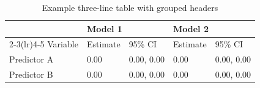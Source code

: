 \begin{table}[htbp]
\raggedright
\caption{Example three-line table with grouped headers}
\label{tab:example_grouped}
\begin{threeparttable}
\begin{tabular}{lllll}
\toprule
 & \multicolumn{2}{l}{Model 1} & \multicolumn{2}{l}{Model 2} \\
\cmidrule(lr){2-3}\cmidrule(lr){4-5}
Variable & Estimate & 95\% CI & Estimate & 95\% CI \\
\midrule
Predictor A & 0.00 & 0.00, 0.00 & 0.00 & 0.00, 0.00 \\
Predictor B & 0.00 & 0.00, 0.00 & 0.00 & 0.00, 0.00 \\
\bottomrule
\end{tabular}
\end{threeparttable}
\end{table}
